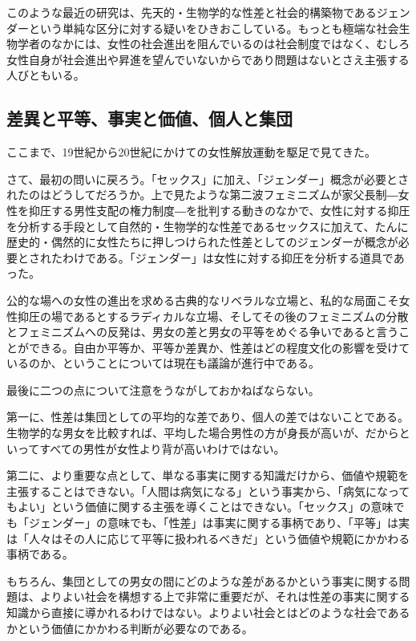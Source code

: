 \documentclass[dvipdfmx,uplatex]{jsarticle}
\begin{document}
このような最近の研究は、先天的・生物学的な性差と社会的構築物であるジェンダーという単純な区分に対する疑いをひきおこしている。もっとも極端な社会生物学者のなかには、女性の社会進出を阻んでいるのは社会制度ではなく、むしろ女性自身が社会進出や昇進を望んでいないからであり問題はないとさえ主張する人びともいる。\citep{browne98:_david_labour}

\subsection{差異と平等、事実と価値、個人と集団}


ここまで、19世紀から20世紀にかけての女性解放運動を駆足で見てきた。

さて、最初の問いに戻ろう。「セックス」に加え、「ジェンダー」概念が必要とされたのはどうしてだろうか。上で見たような第二波フェミニズムが家父長制{\――}女性を抑圧する男性支配の権力制度{\――}を批判する動きのなかで、女性に対する抑圧を分析する手段として自然的・生物学的な性差であるセックスに加えて、たんに歴史的・偶然的に女性たちに押しつけられた性差としてのジェンダーが概念が必要とされたわけである。「ジェンダー」は女性に対する抑圧を分析する道具であった。

公的な場への女性の進出を求める古典的なリベラルな立場と、私的な局面こそ女性抑圧の場であるとするラディカルな立場、そしてその後のフェミニズムの分散とフェミニズムへの反発は、男女の差と男女の平等をめぐる争いであると言うことができる。自由か平等か、平等か差異か、性差はどの程度文化の影響を受けているのか、ということについては現在も議論が進行中である。

最後に二つの点について注意をうながしておかねばならない。

第一に、性差は集団としての平均的な差であり、個人の差ではないことである。生物学的な男女を比較すれば、平均した場合男性の方が身長が高いが、だからといってすべての男性が女性より背が高いわけではない。

第二に、より重要な点として、単なる事実に関する知識だけから、価値や規範を主張することはできない。「人間は病気になる」という事実から、「病気になってもよい」という価値に関する主張を導くことはできない。「セックス」の意味でも「ジェンダー」の意味でも、「性差」は事実に関する事柄であり、「平等」は実は「人々はその人に応じて平等に扱われるべきだ」という価値や規範にかかわる事柄である。

もちろん、集団としての男女の間にどのような差があるかという事実に関する問題は、よりよい社会を構想する上で非常に重要だが、それは性差の事実に関する知識から直接に導かれるわけではない。よりよい社会とはどのような社会であるかという価値にかかわる判断が必要なのである。
\end{document}

